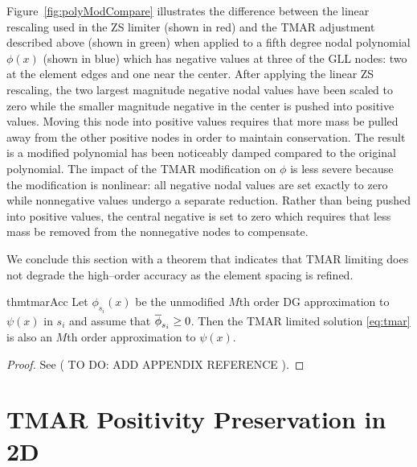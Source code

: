 \documentclass{ametsoc}
\begin{document}
Figure~\ref{fig:polyModCompare} illustrates the difference between the linear rescaling used in the ZS limiter (shown in red) and the TMAR adjustment described above (shown in green) when applied to a fifth degree nodal polynomial $\phi(x)$ (shown in blue) which has negative values at three of the GLL nodes: two at the element edges and one near the center. After applying the linear ZS rescaling, the two largest magnitude negative nodal values have been scaled to zero while the smaller magnitude negative in the center is pushed into positive values. Moving this node into positive values requires that more mass be pulled away from the other positive nodes in order to maintain conservation. The result is a modified polynomial has been noticeably damped compared to the original polynomial. The impact of the TMAR modification on $\phi$ is less severe because the modification is nonlinear: all negative nodal values are set exactly to zero while nonnegative values undergo a separate reduction. Rather than being pushed into positive values, the central negative is set to zero which requires that less mass be removed from the nonnegative nodes to compensate.

We conclude this section with a theorem that indicates that TMAR limiting does not degrade the high--order accuracy as the element spacing is refined.

\begin{restatable}{thm}{tmarAcc}
\label{thm:acc}
Let $\phi_{s_i}(x)$ be the unmodified $M$th order DG approximation to $\psi(x)$ in $s_i$ and assume that $\overline{\phi}_{s_i} \geq 0$. Then the TMAR limited solution \eqref{eq:tmar} is also an $M$th order approximation to $\psi(x)$.
\end{restatable}

\begin{proof}
See \appendix ( TO DO: ADD APPENDIX REFERENCE ).
\end{proof}
\section{TMAR Positivity Preservation in 2D} \label{sec:pp2d}
\end{document}

